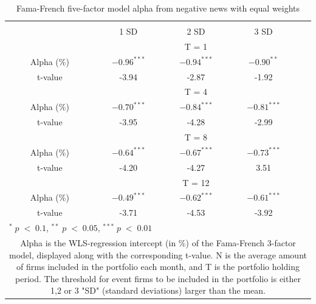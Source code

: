 \setlength{\tabcolsep}{15pt}
\begin{table}[]
\small
\centering
\caption{Fama-French five-factor model alpha from negative news with equal weights} 
\begin{tabular}{ccccccc}
\hline \hline \\ 
 &     &  &    1 SD  &  2 SD  &  3 SD  &  \\ \cline{4-6} 
& & & \multicolumn{3}{c}{ T = 1} & \\ \cline{2-6}
& Alpha (\%)  &  & $-0.96^{***}$  & $-0.94^{***}$  & $-0.90^{**}$ &  \\
& t-value &  & -3.94 & -2.87  & -1.92 & \\
& & & \multicolumn{3}{c}{ T = 4} & \\ \cline{2-6}
& Alpha (\%)  &  & $-0.70^{***}$  & $-0.84^{***}$  &  $-0.81^{***}$ & \\
& t-value & & -3.95 & -4.28 & -2.99 & \\
& & & \multicolumn{3}{c}{ T = 8} & \\ \cline{2-6}
& Alpha (\%)  &  & $-0.64^{***}$   & $-0.67^{***}$  & $-0.73^{***}$ &  \\
& t-value &  & -4.20  & -4.27 & 3.51 & \\
&  & & \multicolumn{3}{c}{ T = 12} & \\ \cline{2-6}
& Alpha (\%)  &  & $-0.49^{***}$  & $-0.62^{***}$  & $-0.61^{***}$ &  \\
& t-value &  & -3.71  & -4.53 & -3.92 & \\
\hline \hline
 \multicolumn{7}{l}{ \footnotesize $^* \; p\; <\; 0.1$, $ ^{**} \; p\; <\; 0.05$, $ ^{***} \; p\; <\; 0.01$  } \\
 \multicolumn{7}{p{11.5cm}}{ \footnotesize Alpha is the WLS-regression intercept (in \%) of the Fama-French 3-factor model, displayed along with the corresponding t-value. N is the average amount of firms included in the portfolio each month, and T is the portfolio holding period. The threshold for event firms to be included in the portfolio is either 1,2 or 3 "SD" (standard deviations) larger than the mean.}  \\ 
\end{tabular}
\label{tab: FF5_neg_sensi_weights}
\end{table}

